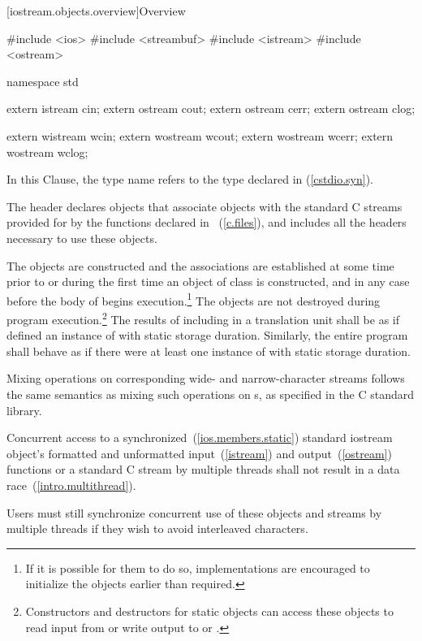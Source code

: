 [iostream.objects.overview]{Overview}

%

\begin{codeblock}
#include <ios>
#include <streambuf>
#include <istream>
#include <ostream>

namespace std {
  extern istream cin;
  extern ostream cout;
  extern ostream cerr;
  extern ostream clog;

  extern wistream wcin;
  extern wostream wcout;
  extern wostream wcerr;
  extern wostream wclog;
}
\end{codeblock}

\pnum
In this Clause, the type name  refers to
the type
declared in
%
(\ref{cstdio.syn}).

\pnum
The header
declares objects that associate objects with the
standard C streams provided for by the functions declared in
~(\ref{c.files}), and includes all the headers necessary to use
these objects.
%

\pnum
The objects are constructed and the associations are established at some
time prior to or during the first time an object of class
 is constructed, and in any case before the body
of  begins execution.\footnote{If it is possible for them to do so, implementations are encouraged to
initialize the objects earlier than required.}
The objects are not destroyed during program execution.\footnote{Constructors and destructors for static objects can
access these objects to read input from
or write output to
or
.
}
The results of including  in a translation unit shall be as if
 defined an instance of  with static
storage duration. Similarly, the entire program shall behave as if there were at least
one instance of  with static storage duration.

\pnum
Mixing operations on corresponding wide- and narrow-character streams
follows the same semantics as mixing such operations on
s,
as specified in the C standard library.

\pnum
Concurrent access to a synchronized~(\ref{ios.members.static}) standard iostream object's formatted and unformatted input~(\ref{istream}) and output~(\ref{ostream}) functions or a standard C stream by multiple threads shall not result in a data race~(\ref{intro.multithread}). \begin{note} Users must still synchronize concurrent use of these objects and streams by multiple threads if they wish to avoid interleaved characters. \end{note}

